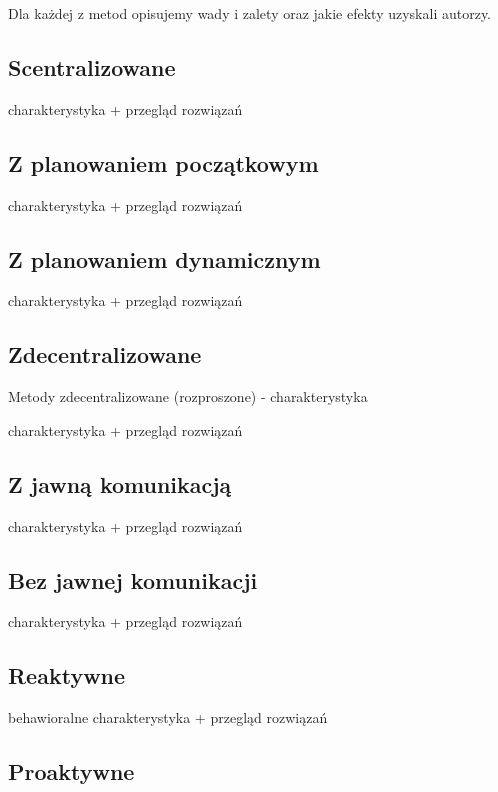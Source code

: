 Dla każdej z metod opisujemy wady i zalety oraz jakie efekty uzyskali autorzy.


\subsection{Scentralizowane}

charakterystyka + przegląd rozwiązań 

\subsection{Z planowaniem początkowym}

charakterystyka + przegląd rozwiązań 

\subsection{Z planowaniem dynamicznym}

charakterystyka + przegląd rozwiązań 

\subsection{Zdecentralizowane}

Metody zdecentralizowane (rozproszone)  - charakterystyka 

charakterystyka + przegląd rozwiązań 

\subsection{Z jawną komunikacją}

charakterystyka + przegląd rozwiązań 

\subsection{Bez jawnej komunikacji}

charakterystyka + przegląd rozwiązań 


\subsection{Reaktywne}

behawioralne
charakterystyka + przegląd rozwiązań 

\subsection{Proaktywne}

